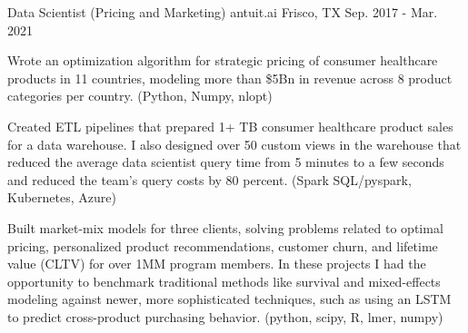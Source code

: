 \begin{cventries}
  \cventry
    {Data Scientist (Pricing and Marketing)} %
    {antuit.ai} %
    {Frisco, TX} %
    {Sep. 2017 - Mar. 2021} %
    {
      \begin{cvitems} %
      \item {
          Wrote an optimization algorithm for strategic pricing of consumer
          healthcare products in 11 countries, modeling more than \$5Bn in
          revenue across 8 product categories per country.
          (Python, Numpy, nlopt)
      }
      \item {
          Created ETL pipelines that prepared 1+ TB consumer healthcare
          product sales for a data warehouse.   I also designed over 50 custom
          views in the warehouse that reduced the average data scientist query
          time from 5 minutes to a few seconds and reduced the team's query
          costs by 80 percent. (Spark SQL/pyspark, Kubernetes, Azure)
      }
      \item {
          Built market-mix models for three clients, solving problems
          related to optimal pricing, personalized product recommendations, customer
          churn, and lifetime value (CLTV) for over 1MM program members.  In
          these projects I had the opportunity to benchmark traditional methods
          like survival and mixed-effects modeling against newer, more
          sophisticated techniques, such as using an LSTM to predict
          cross-product purchasing behavior. (python, scipy, R, lmer, numpy)
      }
      \end{cvitems}
    }

\end{cventries}
